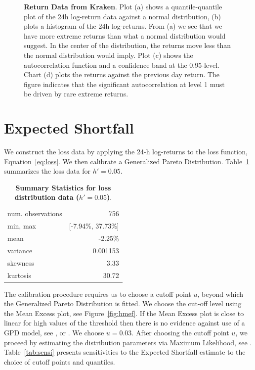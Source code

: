 \documentclass[english,11pt]{article}
\begin{document}
\begin{figure}[p]
\begin{tabular}{cc}
    \end{tabular}
    \caption{\textbf{Return Data from Kraken}. Plot (a) shows a quantile-quantile plot
    of the 24h log-return data against a normal distribution, (b)
    plots a histogram of the 24h log-returns.
    From (a) we see that we have more extreme returns than what a normal
    distribution would suggest. In the center of the distribution, the 
    returns move less than the normal distribution would imply.
    Plot (c) shows the autocorrelation function and a confidence band at the 0.95-level.
    Chart (d) plots the returns against the previous day return. The
    figure indicates that the significant autocorrelation at level 1 must be driven
    by rare extreme returns.
    }\label{fig:qqplots}
\end{figure}


\section{Expected Shortfall}\label{appx:es}
We construct the loss data by applying the 24-h log-returns to the loss
function, Equation~\eqref{eq:loss}. We then calibrate a Generalized Pareto Distribution.
Table~\ref{tab:losssummary} summarizes the loss data for $h'=0.05$.

\begin{table}[!h]
\caption{\textbf{Summary Statistics for loss distribution data ($h'=0.05$)}.\label{tab:losssummary}}
\centering
\begin{tabular}{lr}
\hline
num. observations & 756\\
min, max &[-7.94\%, 37.73\%] \\
mean & -2.25\% \\
variance & 0.001153 \\ 
skewness & 3.33 \\
kurtosis & 30.72 \\
\hline
\end{tabular}
\end{table}

The calibration procedure requires us to choose a cutoff point $u$, beyond which
the Generalized Pareto Distribution is fitted. We choose the cut-off level using the Mean Excess plot, see Figure~\ref{fig:hmef}.
If the Mean Excess plot is close to linear
for high values of the threshold then there is no evidence against use of a GPD model,
see \cite{davison1990models}, or \cite{ghosh2010discussion}.
We choose $u=0.03$. After choosing the cutoff point $u$, we proceed by estimating the distribution
parameters via Maximum Likelihood, see \cite{mcneil2015quantitative}.
Table~\ref{tab:sensi} presents sensitivities to the Expected Shortfall estimate to the choice of cutoff points and quantiles.
\end{document}
